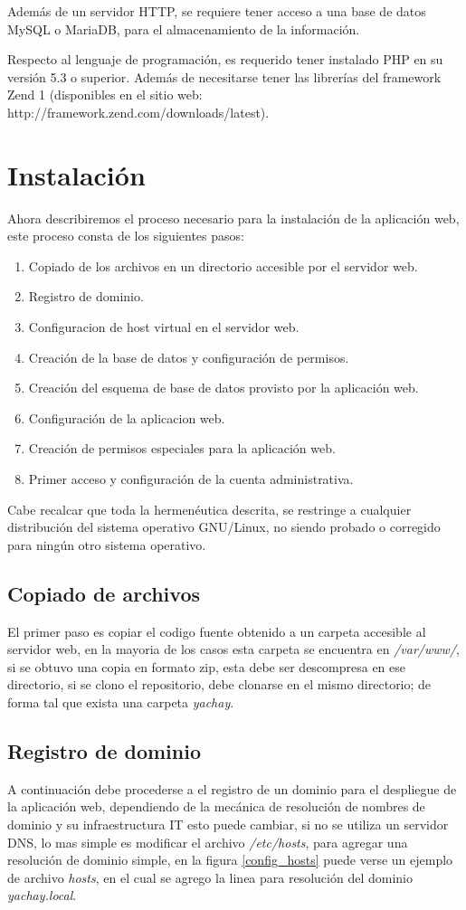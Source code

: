 Además de un servidor HTTP, se requiere tener acceso a una base de datos MySQL o
MariaDB, para el almacenamiento de la información.

Respecto al lenguaje de programación, es requerido tener instalado PHP en su
versión 5.3 o superior. Además de necesitarse tener las librerías del framework
Zend 1 (disponibles en el sitio web:
http://framework.zend.com/downloads/latest).

\section{Instalación}
Ahora describiremos el proceso necesario para la instalación de la aplicación
web, este proceso consta de los siguientes pasos:

\begin{enumerate}
\item Copiado de los archivos en un directorio accesible por el servidor web.
\item Registro de dominio.
\item Configuracion de host virtual en el servidor web.
\item Creación de la base de datos y configuración de permisos.
\item Creación del esquema de base de datos provisto por la aplicación web.
\item Configuración de la aplicacion web.
\item Creación de permisos especiales para la aplicación web.
\item Primer acceso y configuración de la cuenta administrativa.
\end{enumerate}

Cabe recalcar que toda la hermenéutica descrita, se restringe a cualquier
distribución del sistema operativo GNU/Linux, no siendo probado o corregido
para ningún otro sistema operativo.

\subsection{Copiado de archivos}
El primer paso es copiar el codigo fuente obtenido a un carpeta accesible al
servidor web, en la mayoria de los casos esta carpeta se encuentra en
\emph{/var/www/}, si se obtuvo una copia en formato zip, esta debe ser
descompresa en ese directorio, si se clono el repositorio, debe clonarse en el
mismo directorio; de forma tal que exista una carpeta \emph{yachay}.

\subsection{Registro de dominio}
A continuación debe procederse a el registro de un dominio para el despliegue de
la aplicación web, dependiendo de la mecánica de resolución de nombres de
dominio y su infraestructura IT esto puede cambiar, si no se utiliza un servidor
DNS, lo mas simple es modificar el archivo \emph{/etc/hosts}, para agregar una
resolución de dominio simple, en la figura \ref{config_hosts} puede verse un
ejemplo de archivo \emph{hosts}, en el cual se agrego la linea para resolución
del dominio \emph{yachay.local}.

